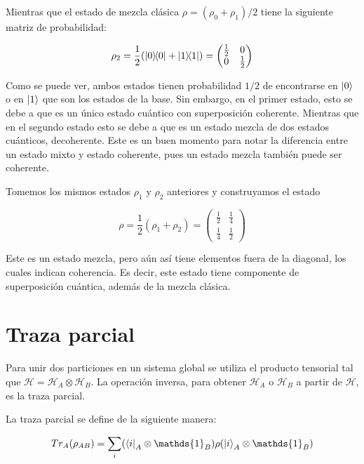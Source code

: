 Mientras que el estado de mezcla clásica $\rho = (\rho_0 + \rho_1)/2$ tiene la siguiente matriz de probabilidad:

\begin{equation}
    \rho_2 = \frac{1}{2} (\ketbra{0}{0} + \ketbra{1}{1}) =
    \begin{pmatrix}
        \frac{1}{2} & 0 \\
        0 & \frac{1}{2}
    \end{pmatrix}
\end{equation}

Como se puede ver, ambos estados tienen probabilidad $1/2$ de encontrarse en $\ket{0}$ o en $\ket{1}$ que son los estados de la base. Sin embargo, en el primer estado, esto se debe a que es un único estado cuántico con superposición coherente. Mientras que en el segundo estado esto se debe a que es un estado mezcla de dos estados cuánticos, decoherente. Este es un buen momento para notar la diferencia entre un estado mixto y estado coherente, pues un estado mezcla también puede ser coherente.

Tomemos los mismos estados $\rho_1$ y $\rho_2$ anteriores y construyamos el estado

\begin{equation}
    \rho = \frac{1}{2} (\rho_1 + \rho_2) =
    \begin{pmatrix}
        \frac{1}{2} & \frac{1}{4} \\
        \frac{1}{4} & \frac{1}{2}
    \end{pmatrix}
\end{equation}

Este es un estado mezcla, pero aún así tiene elementos fuera de la diagonal, los cuales indican coherencia. Es decir, este estado tiene componente de superposición cuántica, además de la mezcla clásica.

\section{Traza parcial}

Para unir dos particiones en un sistema global se utiliza el producto tensorial tal que $\mathcal{H} = \mathcal{H}_A \otimes \mathcal{H}_B$. La operación inversa, para obtener $\mathcal{H}_A$ o $\mathcal{H}_B$ a partir de $\mathcal{H}$, es la traza parcial.

La traza parcial se define de la siguiente manera:

\begin{equation}
    Tr_A(\rho_{A B}) = \sum\limits_i (\bra{i}_A \otimes \mathds{1}_B) \rho (\ket{i}_A \otimes \mathds{1}_B)
\end{equation}

